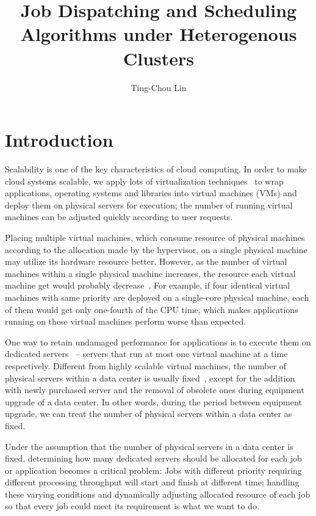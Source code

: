 \documentclass[11pt]{article}
\title{\textbf{Job Dispatching and Scheduling Algorithms under Heterogenous Clusters}}
\author{Ting-Chou Lin\\}
\date{}
\begin{document}
\maketitle

\section{Introduction}

Scalability is one of the key characteristics of cloud computing.  In
order to make cloud systems scalable, we apply lots of virtualization
techniques~\cite{secure_virt_for_cloud, cloud_issue} to wrap
applications, operating systems and libraries into virtual machines
(VMs) and deploy them on physical servers for execution; the number of
running virtual machines can be adjusted quickly according to user
requests.

Placing multiple virtual machines, which consume resource of physical
machines according to the allocation made by the hypervisor, on a single
physical machine may utilize its hardware resource better.  However, as
the number of virtual machines within a single physical machine
increases, the resource each virtual machine get would probably
decrease~\cite{resource_overbooking}.  For example, if four identical
virtual machines with same priority are deployed on a single-core
physical machine, each of them would get only one-fourth of the CPU
time, which makes applications running on these virtual machines perform
worse than expected.

One way to retain undamaged performance for applications is to execute
them on dedicated servers~\cite{dedicated_hosting} -- servers that run
at most one virtual machine at a time respectively.  Different from
highly scalable virtual machines, the number of physical servers within
a data center is usually fixed~\cite{maintenance_framework}, except for
the addition with newly purchased server and the removal of obsolete
ones during equipment upgrade of a data center.  In other words, during
the period between equipment upgrade, we can treat the number of
physical servers within a data center as fixed.

Under the assumption that the number of physical servers in a data
center is fixed, determining how many dedicated servers should be
allocated for each job or application becomes a critical problem:  Jobs
with different priority requiring different processing throughput will
start and finish at different time; handling these varying conditions
and dynamically adjusting allocated resource of each job so that every
job could meet its requirement is what we want to do.
\end{document}
